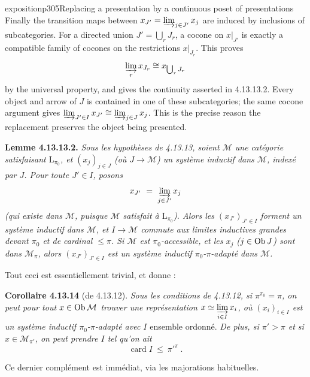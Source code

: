 \begin{dcomment}{exposition}{p305}{Replacing a presentation by a continuous poset of presentations}
Finally the transition maps between $x_{J'}=\varinjlim_{j\in J'}x_j$ are induced by inclusions of subcategories. For a directed union $J'=\bigcup_rJ_r$, a cocone on $x|_{J'}$ is exactly a compatible family of cocones on the restrictions $x|_{J_r}$. This proves
\[
 \varinjlim_r x_{J_r}\cong x_{\bigcup_rJ_r}
\]
by the universal property, and gives the continuity asserted in 4.13.13.2. Every object and arrow of $J$ is contained in one of these subcategories; the same cocone argument gives $\varinjlim_{J'\in I}x_{J'}\cong\varinjlim_{j\in J}x_j$. This is the precise reason the replacement preserves the object being presented.
\end{dcomment}


\noindent\textbf{Lemme 4.13.13.2.} \textit{Sous les hypothèses de 4.13.13, soient $\mathcal{M}$ une catégorie satisfaisant $\mathrm{L}_{\pi_0}$, et $(x_j)_{j\in J}$ (où $J \longrightarrow \mathcal{M}$) un système inductif dans $\mathcal{M}$, indexé par $J$. Pour toute $J' \in I$, posons}
\[
x_{J'} \ = \ \varinjlim_{j\in J'} x_j
\]
\textit{(qui existe dans $\mathcal{M}$, puisque $\mathcal{M}$ satisfait à $\mathrm{L}_{\pi_0}$). Alors les $(x_{J'})_{J'\in I}$ forment un système inductif dans $\mathcal{M}$, et $I \longrightarrow \mathcal{M}$ commute aux limites inductives grandes devant $\pi_0$ et de cardinal $\leqslant \pi$. Si $\mathcal{M}$ est $\pi_0$-accessible, et les $x_j$ ($j \in \operatorname{Ob} J$) sont dans $\mathcal{M}_\pi$, alors $(x_{J'})_{J'\in I}$ est un système inductif $\pi_0$-$\pi$-adapté dans $\mathcal{M}$.}

Tout ceci est essentiellement trivial, et donne :

\noindent\textbf{Corollaire 4.13.14} (de 4.13.12). \textit{Sous les conditions de 4.13.12, si $\pi^{\pi_0} = \pi$, on peut pour tout $x \in \operatorname{Ob}\mathcal{M}$ trouver une représentation $x \simeq \varinjlim\limits_{i\in I} x_i$, où $(x_i)_{i\in I}$ est un système inductif $\pi_0$-$\pi$-adapté avec $I$} ensemble ordonné. \textit{De plus, si $\pi' > \pi$ et si $x \in \mathcal{M}_{\pi'}$, on peut prendre $I$ tel qu'on ait}
\[
\operatorname{card} I \ \leqslant \ {\pi'}^{\pi} \ .
\]

Ce dernier complément est immédiat, via les majorations habituelles.

